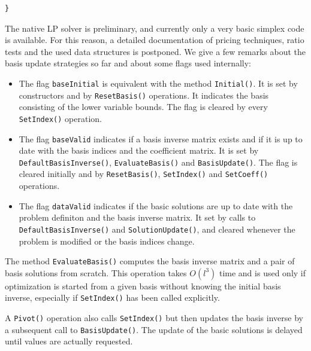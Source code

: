 \documentclass[a4paper,11pt,twoside]{book}
\begin{document}
\begin{multicols}{2}
\begin{mymethods}
\begin{verbatim}
}
\end{verbatim}
\end{mymethods}
The native LP solver is preliminary, and currently only a very basic
simplex code is available. For this reason, a detailed documentation of pricing
techniques, ratio tests and the used data structures is postponed. We give a
few remarks about the basis update strategies so far and about some flags used
internally:
\begin{itemize}
\item The flag \verb/baseInitial/ is equivalent with the method \verb/Initial()/.
    It is set by constructors and by \verb/ResetBasis()/ operations. It
    indicates the basis consisting of the lower variable bounds.
    The flag is cleared by every \verb/SetIndex()/ operation.
\item The flag \verb/baseValid/ indicates if a basis inverse matrix exists and
    if it is up to date with the basis indices and the coefficient matrix.
    It is set by \verb/DefaultBasisInverse()/, \verb/EvaluateBasis()/ and
    \verb/BasisUpdate()/. The flag is cleared initially and by
    \verb/ResetBasis()/, \verb/SetIndex()/ and \verb/SetCoeff()/ operations.
\item The flag \verb/dataValid/ indicates if the basic solutions are up to date
    with the problem definiton and the basis inverse matrix. It set by calls to
    \verb/DefaultBasisInverse()/ and \verb/SolutionUpdate()/, and cleared
    whenever the problem is modified or the basis indices change.
\end{itemize}
The method \verb/EvaluateBasis()/ computes the basis inverse matrix and a pair
of basis solutions from scratch. This operation takes $O(l^3)$ time and is
used only if optimization is started from a given basis without knowing the
initial basis inverse, especially if \verb/SetIndex()/ has been called
explicitly.

A \verb/Pivot()/ operation also calls \verb/SetIndex()/ but then updates the
basis inverse by a subsequent call to \verb/BasisUpdate()/. The update of the
basic solutions is delayed until values are actually requested.


\newpage
{}

\end{multicols}
\end{document}
